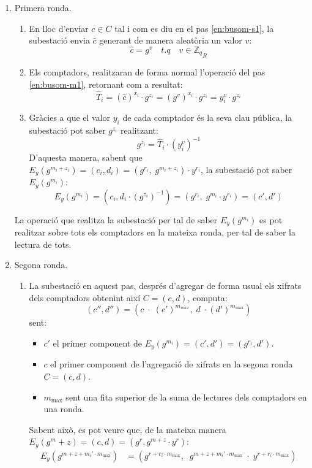 \begin{enumerate}
	\item Primera ronda.
	\begin{enumerate}
		\item En lloc d'enviar $c \in C$ tal i com es diu en el pas \ref{en:busom-s1}, la subestació envia $\hat{c}$ generant de manera aleatòria un valor $v$:
		\[\hat{c} = g^v \quad t.q \quad v \in {\mathbb{Z}_{q}}_R\]
		\item Els comptadors, realitzaran de forma normal l'operació del pas \ref{en:busom-m1}, retornant com a resultat:
		\[\hat{T}_i = (\hat{c})^{x_i} \cdot g^{z_i} = (g^v)^{x_i} \cdot g^{z_i} = y_i^v \cdot g^{z_i}\]
		\item Gràcies a que el valor $y_i$ de cada comptador és la seva clau pública, la subestació pot saber $g^{z_i}$ realitzant:
		\[g^{z_i} = \hat{T}_i \cdot (y_i^v)^{-1}\]
		D'aquesta manera, sabent que $E_y(g^{m_i + z_i}) = (c_i, d_i) = (g^{r_i}, \; g^{m_i + z_i}) \cdot y^{r_i}$, la subestació pot saber $E_y(g^{m_i})$:
		\[E_y(g^{m_i}) = (c_i, d_i \cdot (g^{z_i})^{-1}) = (g^{r_i}, \; g^{m_i} \cdot y^{r_i}) = (c', d')\]
	\end{enumerate}
	La operació que realitza la subestació per tal de saber $E_y(g^{m_i})$ es pot realitzar sobre tots els comptadors en la mateixa ronda, per tal de saber la lectura de tots.
	\item Segona ronda.
	\begin{enumerate}
		\item La subestació en aquest pas, després d'agregar de forma usual els xifrats dels comptadors obtenint així $C = (c, d)$, computa:
		\[(c'', d'') = (c \; \cdot \; (c')^{m_{max}}, \; d \; \cdot (d')^{m_{\textrm{max}}})\]
		sent:
		\begin{itemize}
			\item $c'$ el primer component de $E_y(g^{m_i}) = (c', d') = (g^{r_i}, d')$.
			\item $c$ el primer component de l'agregació de xifrats en la segona ronda $C = (c,d)$.
			\item $m_{\textrm{max}}$ sent una fita superior de la suma de lectures dels comptadors en una ronda.
		\end{itemize}
		Sabent això, es pot veure que, de la mateixa manera $E_y(g^m+z) = (c, d) = (g^r, g^{m+z} \cdot y^r)$:
		\begin{align*}
		E_y(g^{m + z + m_i'\cdot m_{\textrm{max}}}) &= (g^{r + r_i \cdot m_{\textrm{max}}}, \;\; g^{m + z + m_i' \cdot m_{\textrm{max}}} \; \cdot \; y^{r + r_i \cdot m_{\textrm{max}}}) \\

\end{align*}
\end{enumerate}
\end{enumerate}
